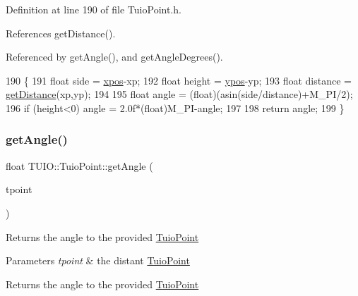 Definition at line 190 of file Tuio\+Point.\+h.



References get\+Distance().



Referenced by get\+Angle(), and get\+Angle\+Degrees().


\begin{DoxyCode}
190                                             \{
191             \textcolor{keywordtype}{float} side = \hyperlink{class_t_u_i_o_1_1_tuio_point_a0021f8dfddd05f2a17e713a94f5457e6}{xpos}-xp;
192             \textcolor{keywordtype}{float} height = \hyperlink{class_t_u_i_o_1_1_tuio_point_a89a038775a681166168735dbc95c7779}{ypos}-yp;
193             \textcolor{keywordtype}{float} distance = \hyperlink{class_t_u_i_o_1_1_tuio_point_ab73aa4898ec2db72bd64b029473a8069}{getDistance}(xp,yp);
194             
195             \textcolor{keywordtype}{float} angle = (float)(asin(side/distance)+M\_PI/2);
196             \textcolor{keywordflow}{if} (height<0) angle = 2.0f*(float)M\_PI-angle;
197             
198             \textcolor{keywordflow}{return} angle;
199         \}
\end{DoxyCode}
\mbox{\label{class_t_u_i_o_1_1_tuio_point_ac2598b8fe91f7417069a1c0e294bf6e4}} 
\subsubsection{\texorpdfstring{get\+Angle()}{getAngle()}\hspace{0.1cm}{\footnotesize\ttfamily [2/2]}}
{\footnotesize\ttfamily float T\+U\+I\+O\+::\+Tuio\+Point\+::get\+Angle (\begin{DoxyParamCaption}\item[{\hyperlink{class_t_u_i_o_1_1_tuio_point}{Tuio\+Point} $\ast$}]{tpoint }\end{DoxyParamCaption})\hspace{0.3cm}{\ttfamily [inline]}}

Returns the angle to the provided \hyperlink{class_t_u_i_o_1_1_tuio_point}{Tuio\+Point}


\begin{DoxyParams}{Parameters}
{\em tpoint} & the distant \hyperlink{class_t_u_i_o_1_1_tuio_point}{Tuio\+Point} \\
\hline
\end{DoxyParams}
\begin{DoxyReturn}{Returns}
the angle to the provided \hyperlink{class_t_u_i_o_1_1_tuio_point}{Tuio\+Point} 
\end{DoxyReturn}


